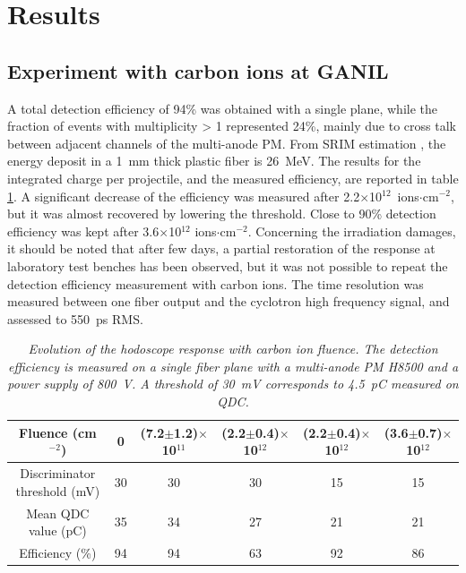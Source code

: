 \documentclass[a4paper,11pt]{article}
\begin{document}
\section{Results}
\subsection{Experiment with carbon ions at GANIL}
A total detection efficiency of 94\% was obtained with a single plane, while the fraction of events with multiplicity > 1 represented 24\%, mainly due to cross talk between adjacent channels of the multi-anode PM.
From SRIM estimation \cite{Ziegler2010}, the energy deposit in a 1~mm thick plastic fiber is 26~MeV. The results for the integrated charge per projectile, and the measured efficiency, are reported in table \ref{tab:GANIL}. A significant decrease of the efficiency was measured after 2.2$\times$10$^{12}$~ions$\cdot$cm$^{-2}$, but it was almost recovered by lowering the threshold. 
Close to 90\% detection efficiency was kept after 3.6$\times$10$^{12}$ ions$\cdot$cm$^{-2}$.
Concerning the irradiation damages, it should be noted that after few days, a partial restoration of the response at laboratory test benches has been observed, but it was not possible to repeat the detection efficiency measurement with carbon ions. 
The time resolution was measured between one fiber output and the cyclotron high frequency signal, and assessed to 550~ps RMS. 
\begin{table}[htb]
\caption{\small{\textit{Evolution of the hodoscope response with carbon ion fluence. The detection efficiency is measured on a single fiber plane with a multi-anode PM H8500 and a power supply of 800~V. A threshold of 30~mV corresponds to 4.5~pC measured on QDC.}}}
\centering
\begin{tabular}{|c|c|c|c|c|c|}
\hline
Fluence (cm$^{-2}$)& 0 & (7.2$\pm$1.2)$\times$10$^{11}$ & (2.2$\pm$0.4)$\times$10$^{12}$ & (2.2$\pm$0.4)$\times$10$^{12}$ & (3.6$\pm$0.7)$\times$10$^{12}$\\
\hline
\makecell{Discriminator\\threshold (mV)} & 30 & 30 & 30 & 15 & 15\\
\hline
\makecell{Mean QDC\\value (pC)} & 35 & 34 & 27 & 21 & 21\\
\hline
Efficiency (\%) & 94 & 94 & 63 & 92 & 86\\
\hline
\end{tabular}
\label{tab:GANIL}
\end{table}
\end{document}
